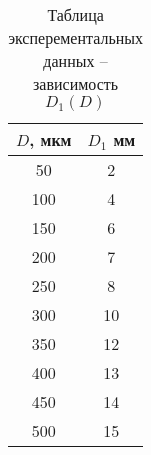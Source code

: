 \begin{table}[]
    \centering
    \begin{tabular}{|c|c|}
        \hline
        $D$, мкм & $D_1$ мм \\ \hline
        50       & 2         \\ \hline
        100      & 4         \\ \hline
        150      & 6         \\ \hline
        200      & 7         \\ \hline
        250      & 8         \\ \hline
        300      & 10        \\ \hline
        350      & 12        \\ \hline
        400      & 13        \\ \hline
        450      & 14        \\ \hline
        500      & 15        \\ \hline
    \end{tabular}
	\caption{Таблица эксперементальных данных -- зависимость $D_1(D)$}
	\label{table:table_1}
\end{table}